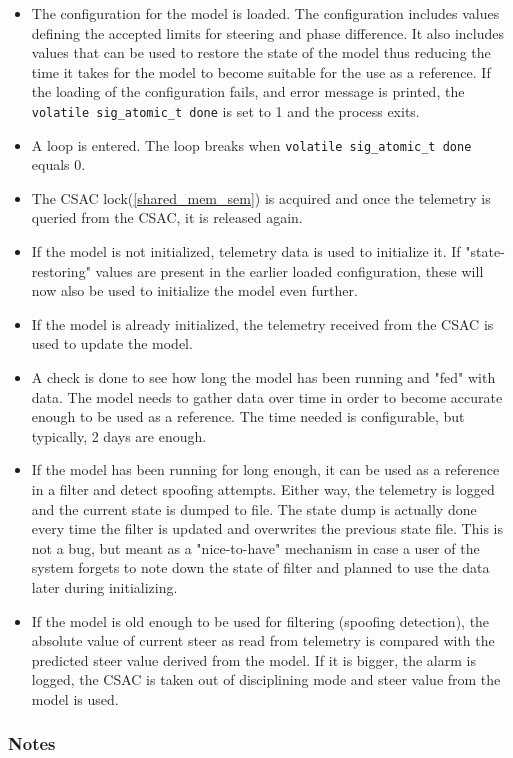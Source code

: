\documentclass[12pt,english,a4paper]{report}
\begin{document}
\begin{itemize}
  \item The configuration for the model is loaded. The configuration includes values defining the accepted limits for steering and phase difference. It also includes values that can be used to restore the state of the model thus reducing the time it takes for the model to become suitable for the use as a reference. If the loading of the configuration fails, and error message is printed, the \texttt{volatile sig\_atomic\_t done} is set to 1 and the process exits.
  \item A loop is entered. The loop breaks when \texttt{volatile sig\_atomic\_t done} equals 0. 
  \item The CSAC lock(\ref{shared_mem_sem}) is acquired and once the telemetry is queried from the CSAC, it is released again.
  \item If the model is not initialized, telemetry data is used to initialize it. If "state-restoring" values are present in the earlier loaded configuration, these will now also be used to initialize the model even further.
  \item If the model is already initialized, the telemetry received from the CSAC is used to update the model. 
  \item A check is done to see how long the model has been running and "fed" with data. The model needs to gather data over time in order to become accurate enough to be used as a reference. The time needed is configurable, but typically, 2 days are enough. 
  \item If the model has been running for long enough, it can be used as a reference in a filter and detect spoofing attempts. Either way, the telemetry is logged and the current state is dumped to file. The state dump is actually done every time the filter is updated and overwrites the previous state file. This is not a bug, but meant as a "nice-to-have" mechanism in case a user of the system forgets to note down the state of filter and planned to use the data later during initializing. 
  \item If the model is old enough to be used for filtering (spoofing detection), the absolute value of current steer as read from telemetry is compared with the predicted steer value derived from the model. If it is bigger, the alarm is logged, the CSAC is taken out of disciplining mode and steer value from the model is used.
\end{itemize}

\subsubsection{Notes}
\end{document}
